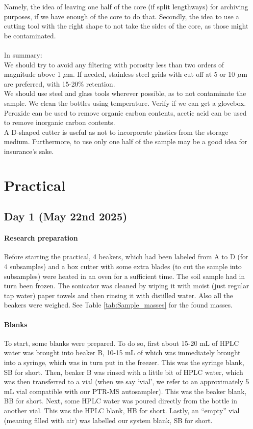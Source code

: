 \documentclass[twocolumn,a4paper,aps,amsmath,amssymb,floatfix,superscriptaddress]{revtex4-2}
\begin{document}
	Namely, the idea of leaving one half of the core (if split lengthways) for archiving purposes, if we have enough of the core to do that. Secondly, the idea to use a cutting tool with the right shape to not take the sides of the core, as those might be contaminated.\\
	\\
	In summary:\\
	We should try to avoid any filtering with porosity less than two orders of magnitude above 1 $\mu$m. If needed, stainless steel grids with cut off at 5 or 10 $\mu$m are preferred, with 15-20\% retention.\\
	We should use steel and glass tools wherever possible, as to not contaminate the sample.
	We clean the bottles using temperature. Verify if we can get a glovebox.\\
	Peroxide can be used to remove organic carbon contents, acetic acid can be used to remove inorganic carbon contents.\\
	A D-shaped cutter is useful as not to incorporate plastics from the storage medium. Furthermore, to use only one half of the sample may be a good idea for insurance's sake.
	
	\section{Practical}
	\subsection{Day 1 (May 22nd 2025)}
	\paragraph*{Research preparation}
	Before starting the practical, 4 beakers, which had been labeled from A to D (for 4 subsamples) and a box cutter with some extra blades (to cut the sample into subsamples) were heated in an oven for a sufficient time. The soil sample had in turn been frozen. The sonicator was cleaned by wiping it with moist (just regular tap water) paper towels and then rinsing it with distilled water. Also all the beakers were weighed. See Table \ref{tab:Sample_masses} for the found masses.
	\paragraph*{Blanks}
	To start, some blanks were prepared. To do so, first about 15-20 mL of HPLC water was brought into beaker B, 10-15 mL of which was immediately brought into a syringe, which was in turn put in the freezer. This was the syringe blank, SB for short. Then, beaker B was rinsed with a little bit of HPLC water, which was then transferred to a vial (when we say `vial', we refer to an approximately 5 mL vial compatible with our PTR-MS autosampler). This was the beaker blank, BB for short. Next, some HPLC water was poured directly from the bottle in another vial. This was the HPLC blank, HB for short. Lastly, an ``empty'' vial (meaning filled with air) was labelled our system blank, SB for short.
\end{document}
